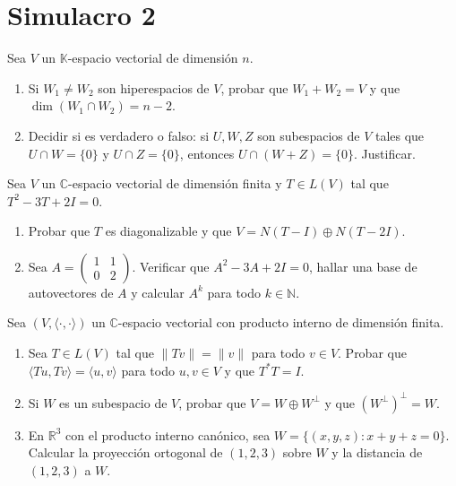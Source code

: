\documentclass{article}
\newcommand{\R}{\mathbb{R}}
\newcommand{\N}{\mathbb{N}}
\newcommand{\C}{\mathbb{C}}
\newcommand{\K}{\mathbb{K}}
\newcommand{\ip}[2]{\langle #1, #2\rangle}
\newenvironment{ejercicio}[1]{\begin{trivlist}
\item[\hskip \labelsep {\bfseries #1.}]}{\end{trivlist}}
\begin{document}
\newpage
\section*{Simulacro 2}

\begin{ejercicio}{1}
    Sea \( V \) un \( \K \)-espacio vectorial de dimensión \( n \).
    \begin{enumerate}
        \item Si \( W_1 \neq W_2 \) son hiperespacios de \( V \), probar que \( W_1 + W_2 = V \) y que \( \dim(W_1 \cap W_2) = n - 2 \).
        \item Decidir si es verdadero o falso: si \( U, W, Z \) son subespacios de \( V \) tales que \( U \cap W = \{0\} \) y \( U \cap Z = \{0\} \), entonces \( U \cap (W + Z) = \{0\} \). Justificar.
    \end{enumerate}
\end{ejercicio}

\begin{ejercicio}{2}
    Sea \( V \) un \( \C \)-espacio vectorial de dimensión finita y \( T \in L(V) \) tal que \( T^2 - 3T + 2I = 0 \).
    \begin{enumerate}
        \item Probar que \( T \) es diagonalizable y que \( V = N(T - I) \oplus N(T - 2I) \).
        \item Sea \( A = \begin{pmatrix} 1 & 1 \\ 0 & 2 \end{pmatrix} \). Verificar que \( A^2 - 3A + 2I = 0 \), hallar una base de autovectores de \( A \) y calcular \( A^k \) para todo \( k \in \N \).
    \end{enumerate}
\end{ejercicio}

\begin{ejercicio}{3}
    Sea \( (V, \ip{\cdot}{\cdot}) \) un \( \C \)-espacio vectorial con producto interno de dimensión finita.
    \begin{enumerate}
        \item Sea \( T \in L(V) \) tal que \( \|Tv\| = \|v\| \) para todo \( v \in V \). Probar que \( \ip{Tu}{Tv} = \ip{u}{v} \) para todo \( u, v \in V \) y que \( T^*T = I \).
        \item Si \( W \) es un subespacio de \( V \), probar que \( V = W \oplus W^\perp \) y que \( (W^\perp)^\perp = W \).
        \item En \( \R^3 \) con el producto interno canónico, sea \( W = \{(x, y, z) : x + y + z = 0\} \). Calcular la proyección ortogonal de \( (1, 2, 3) \) sobre \( W \) y la distancia de \( (1,2,3) \) a \( W \).
    \end{enumerate}
\end{ejercicio}
\end{document}
